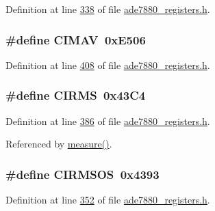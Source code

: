 Definition at line \hyperlink{a00036_source_l00338}{338} of file \hyperlink{a00036_source}{ade7880\-\_\-registers.\-h}.

\hypertarget{a00036_a279075dbebc70897157abb9cf29f488b}{
\subsubsection[{C\-I\-M\-A\-V}]{\setlength{\rightskip}{0pt plus 5cm}\#define C\-I\-M\-A\-V~0x\-E506}}\label{de/d8c/a00036_a279075dbebc70897157abb9cf29f488b}


Definition at line \hyperlink{a00036_source_l00408}{408} of file \hyperlink{a00036_source}{ade7880\-\_\-registers.\-h}.

\hypertarget{a00036_a3ccd0ef2a55b24f358292694724d37a3}{
\subsubsection[{C\-I\-R\-M\-S}]{\setlength{\rightskip}{0pt plus 5cm}\#define C\-I\-R\-M\-S~0x43\-C4}}\label{de/d8c/a00036_a3ccd0ef2a55b24f358292694724d37a3}


Definition at line \hyperlink{a00036_source_l00386}{386} of file \hyperlink{a00036_source}{ade7880\-\_\-registers.\-h}.



Referenced by \hyperlink{a00042_source_l00040}{measure()}.

\hypertarget{a00036_aff79e00cb47bdd946aaf31c86bfb337c}{
\subsubsection[{C\-I\-R\-M\-S\-O\-S}]{\setlength{\rightskip}{0pt plus 5cm}\#define C\-I\-R\-M\-S\-O\-S~0x4393}}\label{de/d8c/a00036_aff79e00cb47bdd946aaf31c86bfb337c}


Definition at line \hyperlink{a00036_source_l00352}{352} of file \hyperlink{a00036_source}{ade7880\-\_\-registers.\-h}.

